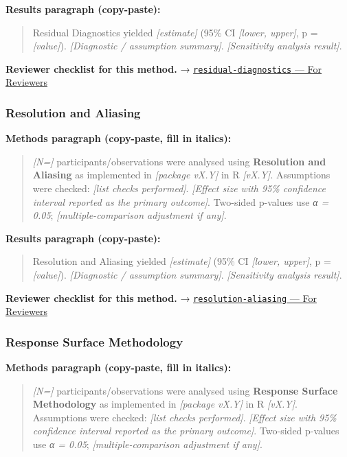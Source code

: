 \documentclass[
]{article}
\begin{document}
\textbf{Results paragraph (copy-paste):}

\begin{quote}
Residual Diagnostics yielded \emph{{[}estimate{]}} (95\% CI
\emph{{[}lower, upper{]}}, p = \emph{{[}value{]}}). \emph{{[}Diagnostic
/ assumption summary{]}}. \emph{{[}Sensitivity analysis result{]}}.
\end{quote}

\textbf{Reviewer checklist for this method.} →
\href{../chapters/07-regression/residual-diagnostics.Rmd\#for-reviewers}{\texttt{residual-diagnostics}
--- For Reviewers}

\subsubsection{Resolution and Aliasing}\label{resolution-and-aliasing}

\textbf{Methods paragraph (copy-paste, fill in italics):}

\begin{quote}
\emph{{[}N={]}} participants/observations were analysed using
\textbf{Resolution and Aliasing} as implemented in \emph{{[}package
vX.Y{]}} in R \emph{{[}vX.Y{]}}. Assumptions were checked: \emph{{[}list
checks performed{]}}. \emph{{[}Effect size with 95\% confidence interval
reported as the primary outcome{]}}. Two-sided p-values use \emph{α =
0.05}; \emph{{[}multiple-comparison adjustment if any{]}}.
\end{quote}

\textbf{Results paragraph (copy-paste):}

\begin{quote}
Resolution and Aliasing yielded \emph{{[}estimate{]}} (95\% CI
\emph{{[}lower, upper{]}}, p = \emph{{[}value{]}}). \emph{{[}Diagnostic
/ assumption summary{]}}. \emph{{[}Sensitivity analysis result{]}}.
\end{quote}

\textbf{Reviewer checklist for this method.} →
\href{../chapters/16-design/resolution-aliasing.Rmd\#for-reviewers}{\texttt{resolution-aliasing}
--- For Reviewers}

\subsubsection{Response Surface
Methodology}\label{response-surface-methodology}

\textbf{Methods paragraph (copy-paste, fill in italics):}

\begin{quote}
\emph{{[}N={]}} participants/observations were analysed using
\textbf{Response Surface Methodology} as implemented in \emph{{[}package
vX.Y{]}} in R \emph{{[}vX.Y{]}}. Assumptions were checked: \emph{{[}list
checks performed{]}}. \emph{{[}Effect size with 95\% confidence interval
reported as the primary outcome{]}}. Two-sided p-values use \emph{α =
0.05}; \emph{{[}multiple-comparison adjustment if any{]}}.
\end{quote}
\end{document}
